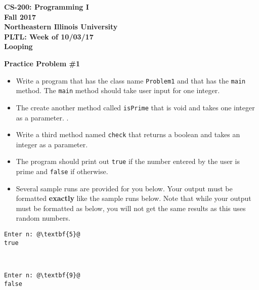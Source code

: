 \documentclass[12pt]{article}
\begin{document}
\begin{center}
	\textbf{CS-200: Programming I}\\
	\textbf{Fall 2017}\\
	\textbf{Northeastern Illinois University}\\
	\textbf{PLTL: Week of 10/03/17}\\
	\textbf{Looping}
\end{center}


\noindent\textbf{Practice Problem \#1}
\begin{itemize}
	\item Write a program that has the class name \texttt{Problem1} and that has the \texttt{main} method. The \texttt{main} method should take user input for one integer.
	\item The create another method called \texttt{isPrime} that is void and takes one integer as a parameter. .
	\item Write a third method named \texttt{check} that returns a boolean and takes an integer as a parameter.
	\item The program should print out \texttt{true} if the number entered by the user is prime and \texttt{false} if otherwise.
	\item Several sample runs are provided for you below. Your output must be formatted \textbf{exactly} like the sample runs below. Note that while your output must be formatted as below, you will not get the same results as this uses random numbers.
\end{itemize}
\begin{center}
\begin{minipage}{8cm}
\begin{lstlisting}[escapechar=@]
Enter n: @\textbf{5}@
true
\end{lstlisting}
\end{minipage}\\
\vspace*{0.5cm}
\begin{minipage}{8cm}
\begin{lstlisting}[escapechar=@]
Enter n: @\textbf{9}@
false
\end{lstlisting}
\end{minipage}
\end{center}
\end{document}
